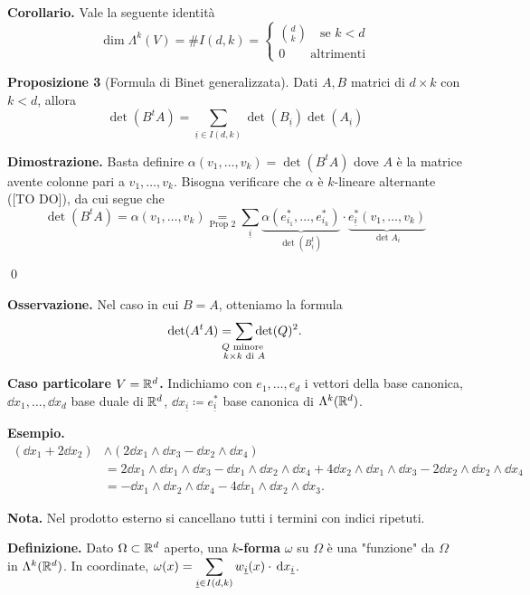\textbf{Corollario.} Vale la seguente identità 
%
$$
\dim \Lambda^k(V) = \# I(d,k) = 
\begin{cases}
	\binom{d}{k} \quad \text{se } k < d \\
	0 \qquad \text{altrimenti} 
\end{cases} 
$$
%

\textbf{Proposizione 3} (Formula di Binet generalizzata).
Dati $A,B$ matrici di $d \times k$ con $k < d$, allora
%
$$
	\det(B^tA) = \sum_{\underline{i} \in I(d,k)} \det(B_{\underline{i}}) \det (A_{\underline{i}})
$$
%

\textbf{Dimostrazione.} Basta definire $\alpha(v_1,\ldots,v_k) = \det(B^t A)$ dove $A$ è la matrice avente colonne pari a $v_1,\ldots,v_k$.
Bisogna verificare che $\alpha$ è $k$-lineare alternante ([TO DO]), da cui segue che
%
$$
	\det(B^tA) = \alpha(v_1,\ldots,v_k) 
	\underset{\text{Prop 2} }{=} \sum_{\underline{i}} \underbrace{\alpha(e_{i_1}^*,\ldots,e_{i_k}^*)}_{\det(B_{\underline{i}}^t)}
	\cdot \underbrace{e_{\underline{i}}^* (v_1,\ldots,v_k)}_{\det A_i}
$$
%

\qed

\textbf{Osservazione.} Nel caso in cui $B = A$, otteniamo la formula
%
$$
	\det(A^tA) = \sum_{\mathclap{\substack{Q \text{ minore } \\ k \times k \text{ di } A }}} \det(Q)^2.
$$
%


\textbf{Caso particolare $V = \mathbb R^d$.} Indichiamo con $e_1,\ldots,e_d$ i vettori della base canonica, $\dd x_1,\ldots, \dd x_d$ base duale di $\mathbb R^d$, $\dd x_{\underline{i}} \coloneqq e_{\underline{i}}^*$ base canonica di $\Lambda^k(\mathbb R^d)$.


\textbf{Esempio.}
\begin{align*}
	(\dd x_1 + 2 \dd x_2) & \wedge (2 \dd x_1 \wedge \dd x_3 - \dd x_2 \wedge\dd x_4) \\
	& = 2 \dd x_1 \wedge\dd x_1 \wedge\dd x_3 - \dd x_1 \wedge\dd x_2 \wedge \dd x_4 + 4 \dd x_2 \wedge\dd x_1 \wedge\dd x_3 - 2 \dd x_2 \wedge\dd x_2 \wedge\dd x_4 \\
	& = - \dd x_1 \wedge\dd x_2 \wedge\dd x_4 - 4 \dd x_1 \wedge\dd x_2 \wedge\dd x_3.
\end{align*}

\textbf{Nota.} Nel prodotto esterno si cancellano tutti i termini con indici ripetuti.

\textbf{Definizione.} Dato $\Omega \subset \mathbb R^d$ aperto, una \textbf{$k$-forma} $\omega$ su $\Omega$ è una "funzione"  da $\Omega$ in $\Lambda^k(\mathbb R^d)$. In coordinate, $\displaystyle \omega(x) = \sum_{\underline{i} \in I(d,k)} w_{\underline{i}}(x) \cdot \,\mathrm{d} x_{\underline{i}}$.

